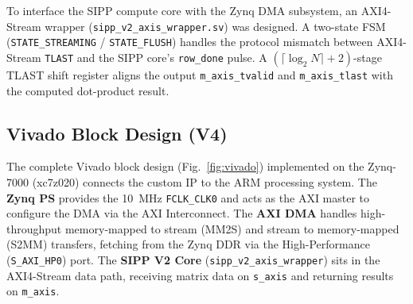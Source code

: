 \documentclass[journal,a4paper]{IEEEtran}
\begin{document}
To interface the SIPP compute core with the Zynq DMA subsystem, an
AXI4-Stream wrapper (\texttt{sipp\_v2\_axis\_wrapper.sv}) was designed.
A two-state FSM (\texttt{STATE\_STREAMING} / \texttt{STATE\_FLUSH})
handles the protocol mismatch between AXI4-Stream \texttt{TLAST}
and the SIPP core's \texttt{row\_done} pulse.
A $(\lceil\log_2 N\rceil+2)$-stage TLAST shift register aligns the
output \texttt{m\_axis\_tvalid} and \texttt{m\_axis\_tlast} with the
computed dot-product result.

\subsection{Vivado Block Design (V4)}

The complete Vivado block design (Fig.~\ref{fig:vivado}) implemented on the
Zynq-7000 (xc7z020) connects the custom IP to the ARM processing system.
The \textbf{Zynq PS} provides the 10~MHz \texttt{FCLK\_CLK0} and acts as the
AXI master to configure the DMA via the AXI Interconnect.
The \textbf{AXI DMA} handles high-throughput memory-mapped to stream (MM2S)
and stream to memory-mapped (S2MM) transfers, fetching from the Zynq DDR via
the High-Performance (\texttt{S\_AXI\_HP0}) port.
The \textbf{SIPP V2 Core} (\texttt{sipp\_v2\_axis\_wrapper}) sits in the
AXI4-Stream data path, receiving matrix data on \texttt{s\_axis} and returning
results on \texttt{m\_axis}.
\end{document}
